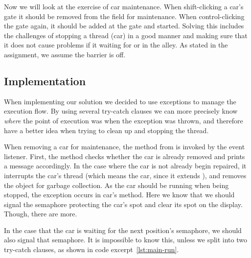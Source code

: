 
Now we will look at the exercise of car maintenance. When
shift-clicking a car's gate it should be removed from the field for
maintenance. When control-clicking the gate again, it should be
added at the gate and started. Solving this includes the challenges of
stopping a thread (car) in a good manner and making sure that it
does not cause problems if it waiting for or in the alley. As stated
in the assignment, we assume the barrier is off.


\subsection{Implementation}
\label{sub:main-moni}
When implementing our solution we decided to use exceptions to manage
the execution flow. By using several try-catch clauses we can more
precisely know \emph{where} the point of execution was when the
exception was thrown, and therefore have a better idea when trying to
clean up and stopping the thread.

When removing a car for maintenance, the  method
from  is invoked by the event listener. First, the
method checks whether the car is already removed and prints a message
accordingly. In the case where the car is not already begin repaired,
it interrupts the car's thread (which means the car, since it extends
), and removes the object for garbage
collection. As the car should be running when being stopped, the
exception occurs in car's  method. Here we know that we
should signal the semaphore protecting the car's spot and clear its
spot on the display. Though, there are more.

In the case that the car is waiting for the next position's semaphore,
we should also signal that semaphore. It is impossible to know this,
unless we split into two try-catch clauses, as shown in code
excerpt~\ref{lst:main-run}.

